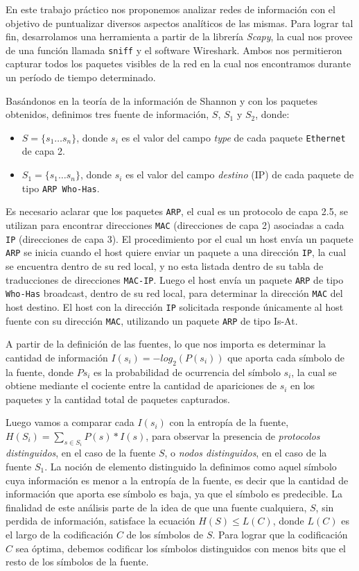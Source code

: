 En este trabajo práctico nos proponemos analizar redes de información con el objetivo de puntualizar diversos aspectos analíticos de las mismas. Para lograr tal fin, desarrolamos una herramienta a partir de la librería \textit{Scapy}, la cual nos provee de una función llamada \texttt{sniff} y el software Wireshark. Ambos nos permitieron capturar todos los paquetes visibles de la red en la cual nos encontramos durante un período de tiempo determinado.

Basándonos en la teoría de la información de Shannon y con los paquetes obtenidos, definimos tres fuente de información, $S$, $S_{1}$ y $S_{2}$, donde:

\begin{itemize}
  \item $S = \{s_{1} \dots s_{n}\}$, donde $s_{i}$ es el valor del campo \emph{type} de cada paquete \texttt{Ethernet} de capa 2.
  \item $S_{1} = \{s_{1} \dots s_{n}\} $, donde $s_i$ es el valor del campo \emph{destino} (IP) de cada paquete de
  tipo \texttt{ARP Who-Has}.
\end{itemize}

Es necesario aclarar que los paquetes \texttt{ARP}, el cual es un protocolo de capa 2.5, se utilizan para encontrar direcciones \texttt{MAC} (direcciones de capa 2) asociadas a cada \texttt{IP} (direcciones de capa 3). El procedimiento por el cual un host envía un paquete \texttt{ARP} se inicia cuando el host quiere enviar un paquete a una dirección \texttt{IP}, la cual se encuentra dentro de su red local, y no esta listada dentro de su tabla de traducciones de direcciones \texttt{MAC-IP}. Luego el host envía un paquete \texttt{ARP} de tipo \texttt{Who-Has} broadcast, dentro de su red local, para determinar la dirección \texttt{MAC} del host destino. El host con la dirección \texttt{IP} solicitada responde únicamente al host fuente con su dirección \texttt{MAC}, utilizando un paquete \texttt{ARP} de tipo Is-At.

A partir de la definición de las fuentes, lo que nos importa es determinar la cantidad de información $I(s_{i}) = -log_2(P(s_{i}))$ que aporta cada símbolo de la fuente, donde $Ps_{i}$ es la probabilidad de ocurrencia del símbolo $s_{i}$, la cual se obtiene mediante el cociente entre la cantidad de apariciones de $s_{i}$ en los paquetes y la cantidad total de paquetes capturados.

Luego vamos a comparar cada $I(s_{i})$ con la entropía de la fuente, $H(S_{i}) = \sum\limits_{s \in S_{i}} P(s) * I(s)$, para observar la presencia de \emph{protocolos distinguidos}, en el caso de la fuente $S$, o \emph{nodos distinguidos}, en el caso de la fuente $S_{1}$. La noción de elemento distinguido la definimos como aquel símbolo cuya información es menor a la entropía de la fuente, es decir que la cantidad de información que aporta ese símbolo es baja, ya que el símbolo es predecible. La finalidad de este análisis parte de la idea de que una fuente cualquiera, $S$, sin perdida de información, satisface la ecuación $H(S) \leq L(C)$, donde $L(C)$ es el largo de la codificación $C$ de los símbolos de $S$. Para lograr que la codificación $C$ sea óptima, debemos codificar los símbolos distinguidos con menos bits que el resto de los símbolos de la fuente.

